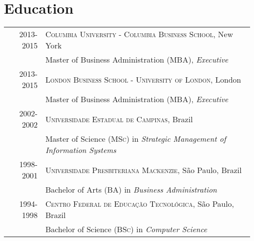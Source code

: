 \documentclass[a4paper,10pt]{article}
\begin{document}
\section{Education}
\begin{tabular}{rl}
 \textsc{2013-2015} & \textsc{Columbia University - Columbia Business School},
 New York\\

 & \footnotesize{Master of Business Administration (\textsc{MBA}),
   \emph{Executive}}\\

 \textsc{2013-2015} & \textsc{London Business School - University of London},
 London\\

 & \footnotesize{Master of Business Administration (\textsc{MBA}),
   \emph{Executive}}\\

 \textsc{2002-2002} & \textsc{Universidade Estadual de Campinas}, Brazil\\

 & \footnotesize{Master of Science (\textsc{MSc}) in \emph{Strategic
   Management of Information Systems}} \\

 \textsc{1998-2001} & \textsc{Universidade Presbiteriana Mackenzie}, S\~{a}o
 Paulo, Brazil\\

 & \footnotesize{Bachelor of Arts (\textsc{BA}) in \emph{Business
   Administration}} \\

 \textsc{1994-1998} & \textsc{Centro Federal de Educa\c{c}\~{a}o
   Tecnol\'{o}gica}, S\~{a}o Paulo, Brazil\\

 & \footnotesize{Bachelor of Science (\textsc{BSc}) in \emph{Computer
   Science}} \\

\end{tabular}
\end{document}
